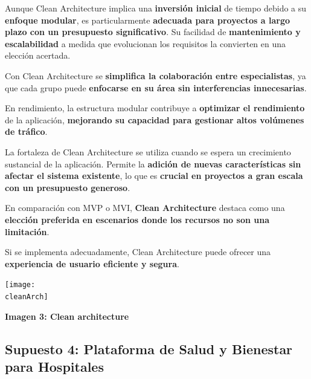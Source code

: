 \documentclass[a4paper]{article}
\newcommand{\cleanArch}{imagenes/CleanArchitecture.jpg}
\begin{document}
    Aunque Clean Architecture implica una \textbf{inversión inicial} de tiempo debido a su \textbf{enfoque modular}, es particularmente \textbf{adecuada para proyectos a largo plazo con un presupuesto significativo}. Su facilidad de \textbf{mantenimiento y escalabilidad} a medida que evolucionan los requisitos la convierten en una elección acertada.\vspace{0.3cm}
    
   Con Clean Architecture se \textbf{simplifica la colaboración entre especialistas}, ya que cada grupo puede \textbf{enfocarse en su área sin interferencias innecesarias}.\vspace{0.3cm}
    
    En rendimiento, la estructura modular contribuye a \textbf{optimizar el rendimiento} de la aplicación, \textbf{mejorando su capacidad para gestionar altos volúmenes de tráfico}.\vspace{0.3cm}
    
    La fortaleza de Clean Architecture se utiliza cuando se espera un crecimiento sustancial de la aplicación. Permite la \textbf{adición de nuevas características sin afectar el sistema existente}, lo que es \textbf{crucial en proyectos a gran escala con un presupuesto generoso}.\vspace{0.3cm}
    
    En comparación con MVP o MVI, \textbf{Clean Architecture} destaca como una \textbf{elección preferida en escenarios donde los recursos no son una limitación}.\vspace{0.3cm} 
    
    Si se implementa adecuadamente, Clean Architecture puede ofrecer una \textbf{experiencia de usuario eficiente y segura}. 

    \begin{center}
        \texttt{[image: \\cleanArch]}\vspace{0.2cm}\par
        \textbf{Imagen 3: Clean architecture}
    \end{center}

    
    \newpage

    \subsection{Supuesto 4: Plataforma de Salud y Bienestar para Hospitales}
\end{document}
